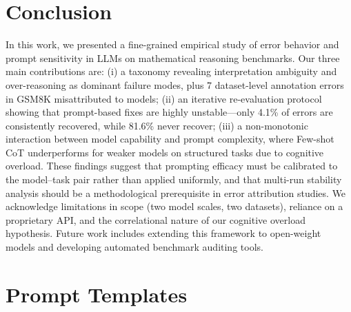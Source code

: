 \documentclass{article}
\begin{document}
\section{Conclusion}
\label{sec:conclusion}
In this work, we presented a fine-grained empirical study of error behavior and prompt sensitivity in LLMs on mathematical reasoning benchmarks. 
Our three main contributions are: 
(i) a taxonomy revealing interpretation ambiguity and over-reasoning as dominant failure modes, plus 7 dataset-level annotation errors in GSM8K misattributed to models; 
(ii) an iterative re-evaluation protocol showing that prompt-based fixes are highly unstable---only 4.1\% of errors are consistently recovered, while 81.6\% never recover; 
(iii) a non-monotonic interaction between model capability and prompt complexity, where Few-shot CoT underperforms for weaker models on structured tasks due to cognitive overload.
These findings suggest that prompting efficacy must be calibrated to the model--task pair rather than applied uniformly, and that multi-run stability analysis should be a methodological prerequisite in error attribution studies. 
We acknowledge limitations in scope (two model scales, two datasets), reliance on a proprietary API, and the correlational nature of our cognitive overload hypothesis. 
Future work includes extending this framework to open-weight models and developing automated benchmark auditing tools.




%
%






\appendix
\section{Prompt Templates}
\label{app:prompts}
\end{document}
